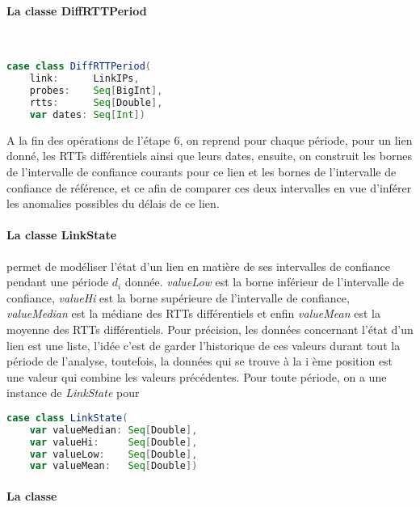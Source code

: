 \paragraph{La classe DiffRTTPeriod } ~
\begin{lstlisting}[language=scala]
case class DiffRTTPeriod(
	link:      LinkIPs,
	probes:    Seq[BigInt],
	rtts:      Seq[Double],
	var dates: Seq[Int])
\end{lstlisting}

A la fin des opérations de l'étape 6, on reprend pour chaque période, pour un lien donné, les RTTs différentiels ainsi que leurs dates, ensuite, on construit les bornes de l'intervalle de confiance courants pour ce lien et les bornes de l'intervalle de confiance de référence, et ce afin de comparer ces deux intervalles en vue d'inférer les anomalies possibles du délais de ce lien.


\paragraph{La classe LinkState } permet de modéliser l'état d'un lien en matière de ses intervalles de confiance pendant une période $d_i$ donnée. \textit{valueLow} est la borne inférieur de l'intervalle de confiance, \textit{valueHi} est la borne supérieure de l'intervalle de confiance, \textit{valueMedian} est la médiane des RTTs différentiels et enfin \textit{valueMean} est la moyenne des RTTs différentiels. Pour précision, les données concernant l'état d'un lien est une liste, l'idée c'est de garder l'historique de ces valeurs durant tout la période de l'analyse, toutefois, la données qui se trouve à la i ème position est une valeur qui combine les valeurs précédentes.  Pour toute période, on a une instance de \textit{LinkState} pour 
\begin{lstlisting}[language=scala]
case class LinkState(
	var valueMedian: Seq[Double],
	var valueHi:     Seq[Double],
	var valueLow:    Seq[Double],
	var valueMean:   Seq[Double])
\end{lstlisting}
\paragraph{La classe } 
\begin{lstlisting}[language=scala]

\end{lstlisting}





